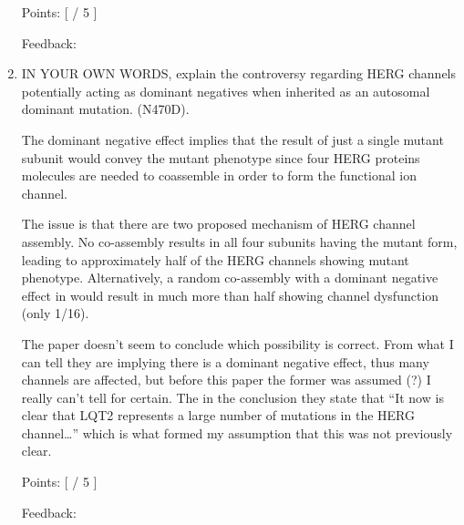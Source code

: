 \documentclass[basic,plain]{inVerba-notes}
\begin{document}
\begin{enumerate}
    Points: [\hspace{16pt} / 5 ]

    Feedback: 

    \newpage

    \item IN YOUR OWN WORDS, explain the controversy regarding HERG channels potentially acting as dominant negatives when inherited as an autosomal dominant mutation. (N470D).
    
    {\color{black}
    The dominant negative effect implies that the result of just a single mutant subunit would convey the mutant phenotype since four HERG proteins molecules are needed to coassemble in order to form the functional ion channel. 

    The issue is that there are two proposed mechanism of HERG channel assembly. No co-assembly results in all four subunits having the mutant form, leading to approximately half of the HERG channels showing mutant phenotype.  Alternatively, a random co-assembly with a dominant negative effect in would result in much more than half showing channel dysfunction (only 1/16).

    The paper doesn't seem to conclude which possibility is correct. From what I can tell they are implying there is a dominant negative effect, thus many channels are affected, but before this paper the former was assumed (?) I really can't tell for certain. The in the conclusion they state that ``It now is clear that LQT2 represents a large number of mutations in the HERG channel\dots'' which is what formed my assumption that this was not previously clear. 
    }

    Points: [\hspace{16pt} / 5 ]

    Feedback: 

    \vspace*{50pt}
\end{enumerate}
\end{document}
